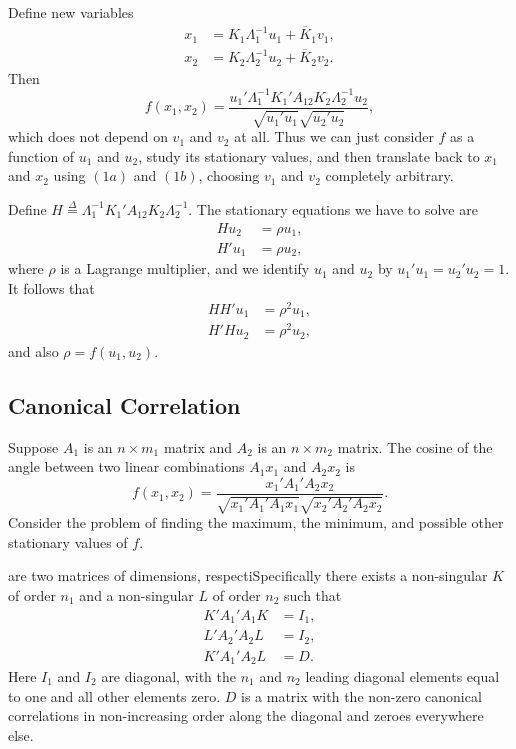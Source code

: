 \documentclass[
  12pt,
]{book}
\begin{document}
Define new variables
\begin{align*}
x_1&=K_1\Lambda_1^{-1}u_1+\overline{K}_1v_1,\tag{1a}\\
x_2&=K_2\Lambda_2^{-1}u_2+\overline{K}_2v_2.\tag{1b}
\end{align*}
Then
\[
f(x_1,x_2)=\frac{u_1'\Lambda_1^{-1}K_1'A_{12}K_2\Lambda_2^{-1}u_2}{\sqrt{u_1'u_1}\sqrt{u_2'u_2}},
\]
which does not depend on \(v_1\) and \(v_2\) at all. Thus we can just consider \(f\) as a function of \(u_1\) and \(u_2\), study its stationary values, and then translate back
to \(x_1\) and \(x_2\) using \((1a)\) and \((1b)\), choosing \(v_1\) and \(v_2\) completely arbitrary.

Define \(H\mathop{=}\limits^{\Delta}\Lambda_1^{-1}K_1'A_{12}K_2\Lambda_2^{-1}\). The stationary equations we have to solve are
\begin{align*}
Hu_2&=\rho u_1,\\
H'u_1&=\rho u_2,
\end{align*}
where \(\rho\) is a Lagrange multiplier, and we identify \(u_1\) and \(u_2\)
by \(u_1'u_1=u_2'u_2=1\). It follows that
\begin{align*}
HH'u_1&=\rho^2 u_1,\\
H'Hu_2&=\rho^2 u_2,
\end{align*}
and also \(\rho=f(u_1,u_2)\).

\hypertarget{canonical-correlation}{%
\subsection{Canonical Correlation}\label{canonical-correlation}}

Suppose \(A_1\) is an \(n\times m_1\) matrix and \(A_2\) is an \(n\times m_2\) matrix. The cosine of the angle between two linear combinations \(A_1x_1\) and \(A_2x_2\) is
\[
f(x_1,x_2)=\frac{x_1'A_1'A_2x_2}{\sqrt{x_1'A_1'A_1x_1}\sqrt{x_2'A_2'A_2x_2}}.
\]
Consider the problem of finding the maximum, the minimum, and possible other stationary values of \(f\).

are two matrices of dimensions, respectiSpecifically there exists
a non-singular \(K\) of order \(n_1\) and a non-singular \(L\) of order \(n_2\) such that
\begin{align*}
K'A_1'A_1^{\ }K&=I_1,\\
L'A_2'A_2^{\ }L&=I_2,\\
K'A_1'A_2^{\ }L&=D.
\end{align*}
Here \(I_1\) and \(I_2\) are diagonal, with the \(n_1\) and \(n_2\) leading diagonal elements
equal to one and all other elements zero. \(D\) is a matrix with the non-zero canonical correlations in non-increasing order along the diagonal and zeroes everywhere else.
\end{document}
